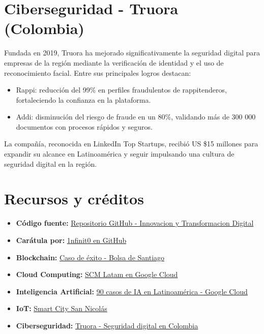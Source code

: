 \documentclass[12pt]{article}
\begin{document}
\section*{Ciberseguridad - Truora (Colombia)}
\noindent Fundada en 2019, Truora ha mejorado significativamente la seguridad digital para empresas de la región mediante la verificación de identidad y el uso de reconocimiento facial. Entre sus principales logros destacan:
\begin{itemize}
    \item Rappi: reducción del 99\% en perfiles fraudulentos de rappitenderos, fortaleciendo la confianza en la plataforma.
    \item Addi: disminución del riesgo de fraude en un 80\%, validando más de 300 000 documentos con procesos rápidos y seguros.
\end{itemize}
La compañía, reconocida en LinkedIn Top Startups, recibió US \$15 millones para expandir su alcance en Latinoamérica y seguir impulsando una cultura de seguridad digital en la región.

\newpage
\section*{Recursos y créditos}

\begin{itemize}
    \item \textbf{Código fuente:} \href{https://github.com/MateoTVara/C08-InnovacionYTransformacionDigital}{Repositorio GitHub - Innovacion y Transformacion Digital}
    \item \textbf{Carátula por:} \href{https://github.com/1nfinit0}{1nfinit0 en GitHub}
    \item \textbf{Blockchain:} \href{https://news.america-digital.com/caso-de-exito-primera-aplicacion-blockchain-en-mercado-de-valores-de-latam-conferencia-cio-bolsa-de-santiago/?utm_source=chatgpt.com}{Caso de éxito - Bolsa de Santiago}
    \item \textbf{Cloud Computing:} \href{https://cloud.google.com/customers/scm-latam?hl=es-419&utm_source=chatgpt.com}{SCM Latam en Google Cloud}
    \item \textbf{Inteligencia Artificial:} \href{https://blog.google/intl/es-419/actualizaciones-de-producto/en-la-nube/google-cloud-90-casos-de-ia-en-latinoamerica-que-inspiran-innovacion/?utm_source=chatgpt.com}{90 casos de IA en Latinoamérica - Google Cloud}
    \item \textbf{IoT:} \href{https://sannicolasciudad.gob.ar/areas/innovacion-y-transformacion-digital/ciudadinteligente}{Smart City San Nicolás}
    \item \textbf{Ciberseguridad:} \href{https://elpais.com/america-colombia/branded/los-lideres-de-colombia/2024-12-05/daniel-bilbao-el-caleno-que-esta-transformando-la-cultura-de-seguridad-digital-en-america-latina.html?utm_source=chatgpt.com}{Truora - Seguridad digital en Colombia}
\end{itemize}
\end{document}
